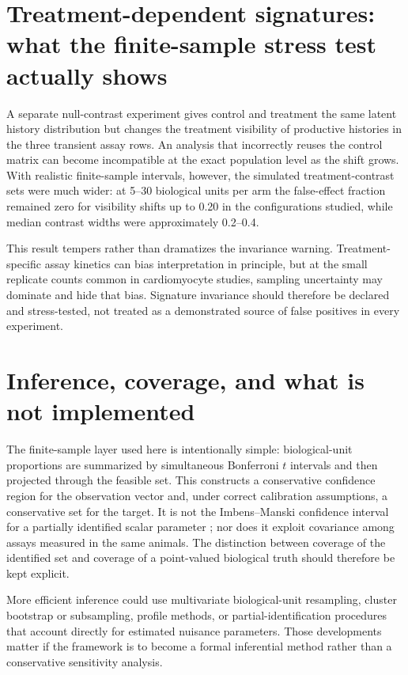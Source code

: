 \documentclass[11pt]{article}
\begin{document}
\section{Treatment-dependent signatures: what the finite-sample stress test actually shows}
A separate null-contrast experiment gives control and treatment the same latent history distribution but changes the treatment visibility of productive histories in the three transient assay rows. An analysis that incorrectly reuses the control matrix can become incompatible at the exact population level as the shift grows. With realistic finite-sample intervals, however, the simulated treatment-contrast sets were much wider: at 5--30 biological units per arm the false-effect fraction remained zero for visibility shifts up to 0.20 in the configurations studied, while median contrast widths were approximately 0.2--0.4.

This result tempers rather than dramatizes the invariance warning. Treatment-specific assay kinetics can bias interpretation in principle, but at the small replicate counts common in cardiomyocyte studies, sampling uncertainty may dominate and hide that bias. Signature invariance should therefore be declared and stress-tested, not treated as a demonstrated source of false positives in every experiment.

\section{Inference, coverage, and what is not implemented}
The finite-sample layer used here is intentionally simple: biological-unit proportions are summarized by simultaneous Bonferroni $t$ intervals and then projected through the feasible set. This constructs a conservative confidence region for the observation vector and, under correct calibration assumptions, a conservative set for the target. It is not the Imbens--Manski confidence interval for a partially identified scalar parameter \citep{ImbensManski2004}; nor does it exploit covariance among assays measured in the same animals. The distinction between coverage of the identified set and coverage of a point-valued biological truth should therefore be kept explicit.

More efficient inference could use multivariate biological-unit resampling, cluster bootstrap or subsampling, profile methods, or partial-identification procedures that account directly for estimated nuisance parameters. Those developments matter if the framework is to become a formal inferential method rather than a conservative sensitivity analysis.
\end{document}
